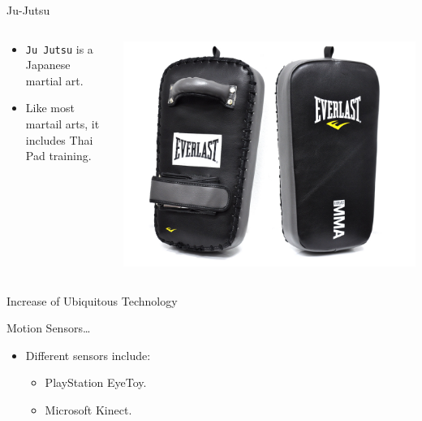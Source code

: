 \documentclass{beamer}
\begin{document}
\begin{frame}{Ju-Jutsu}
\begin{columns}[T]
    \begin{column}{.5\textwidth}

  \begin{itemize}
  \item
    \texttt{Ju Jutsu} is a Japanese martial art.
  \item
    Like most martail arts, it includes Thai Pad training.
  \end{itemize}
    \end{column}
    \begin{column}{.5\textwidth}  
    \includegraphics[scale=0.075]{mma-thai-pads-big.jpg}
    \end{column}
  \end{columns}
\end{frame}

\begin{frame}{Increase of Ubiquitous Technology}

  Motion Sensors\dots
  \begin{itemize}
  \item Different sensors include:
    \begin{itemize}
    \pause    
    \item
      PlayStation EyeToy.
    \pause
    \item    
      Microsoft Kinect.
    \pause
    \end{itemize}
  \end{itemize}
\end{frame}
\end{document}
